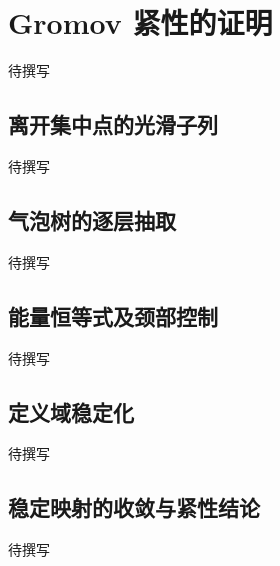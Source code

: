 
% 
% 

\section{Gromov 紧性的证明}
\label{g4:sec:2306}

待撰写

\subsection{离开集中点的光滑子列}
\label{g4:subsec:2306:01}
待撰写

\subsection{气泡树的逐层抽取}
\label{g4:subsec:2306:02}
待撰写

\subsection{能量恒等式及颈部控制}
\label{g4:subsec:2306:03}
待撰写

\subsection{定义域稳定化}
\label{g4:subsec:2306:04}
待撰写

\subsection{稳定映射的收敛与紧性结论}
\label{g4:subsec:2306:05}
待撰写
